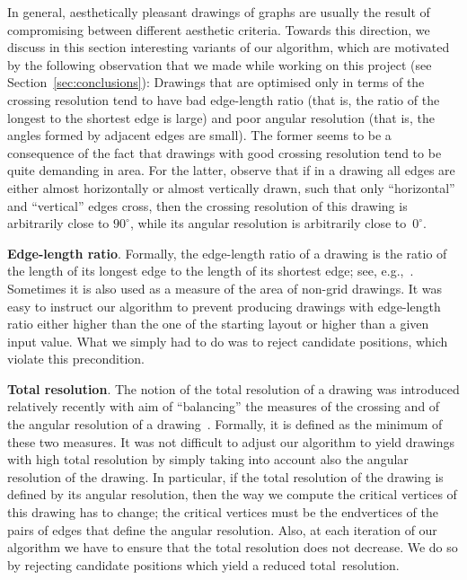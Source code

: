 \documentclass{comjnl}
\newcommand{\myparagraph}[1]{\medskip\noindent\textbf{#1}.}
\begin{document}
In general, aesthetically pleasant drawings of graphs are usually the result of compromising between different aesthetic criteria. Towards this direction, we discuss in this section interesting variants of our algorithm, which are motivated by the following observation that we made while working on this project (see Section~\ref{sec:conclusions}): Drawings that are optimised only in terms of the crossing resolution tend to have bad edge-length ratio (that is, the ratio of the longest to the shortest edge is large) and poor angular resolution (that is, the angles formed by adjacent edges are small). The former seems to be a consequence of the fact that drawings with good crossing resolution tend to be quite demanding in area. For the latter, observe that if in a drawing all edges are either almost horizontally or almost vertically drawn, such that only ``horizontal'' and ``vertical'' edges cross, then the crossing resolution of this drawing is arbitrarily close to $90^\circ$, while its angular resolution is arbitrarily close to~$0^\circ$.

\myparagraph{Edge-length ratio}
%
Formally, the edge-length ratio of a drawing is the ratio of the length of its longest edge to the length of its shortest edge; see, e.g.,~\cite{DBLP:journals/tcs/LazardLL19}. Sometimes it is also used as a measure of the area of non-grid drawings. It was easy to instruct our algorithm to prevent producing drawings with edge-length ratio either higher than the one of the starting layout or higher than a given input value. What we simply had to do was to reject candidate positions, which violate this precondition.

\myparagraph{Total resolution}
%
The notion of the total resolution of a drawing was introduced relatively recently with aim of ``balancing'' the measures of the crossing and of the angular resolution of a drawing~\cite{DBLP:journals/cj/ArgyriouBS13}. Formally, it is defined as the minimum of these two measures. It was not difficult to adjust our algorithm to yield drawings with high total resolution by simply taking into account also the angular resolution of the drawing. In particular, if the total resolution of the drawing is defined by its angular resolution, then the way we compute the critical vertices of this drawing has to change; the critical vertices must be the endvertices of the pairs of edges that define the angular resolution. Also, at each iteration of our algorithm we have to ensure that the total resolution does not decrease. We do so by rejecting candidate positions which yield a reduced total~resolution.
\end{document}
